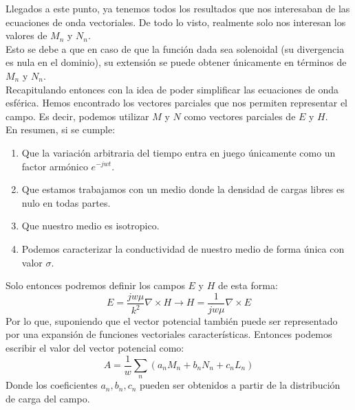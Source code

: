 \documentclass{article}
\begin{document}
Llegados a este punto, ya tenemos todos los resultados que nos interesaban de las ecuaciones de onda vectoriales. De todo lo visto, realmente solo nos interesan los valores de   $M_{n}$ y $N_{n}$.\\
Esto se debe a que en caso de que la función dada sea solenoidal (su divergencia es nula en el dominio), su extensión se puede obtener únicamente en términos de  $M_{n}$ y $N_{n}$. 
\\

Recapitulando entonces con la idea de poder simplificar las ecuaciones de onda esférica. Hemos encontrado los vectores parciales que nos permiten representar el campo. Es decir, podemos utilizar $M$ y $N$ como vectores parciales de $E$ y $H$.\\

En resumen, si se cumple:
\begin{enumerate}
    \item Que la variación arbitraria del tiempo entra en juego únicamente como un factor armónico $e^{-jwt}$.
    \item Que estamos trabajamos con un medio donde la densidad de cargas libres es nulo en todas partes.
    \item   Que nuestro medio es isotropico.
    \item Podemos caracterizar la conductividad de nuestro medio de forma única con valor $\sigma$.

\end{enumerate}
Solo entonces podremos definir los campos $E$ y $H$ de esta forma:
\begin{equation}
E = \frac{jw\mu}{k^2}\nabla \times H\xrightarrow{}   H= \frac{1}{jw\mu}\nabla \times E
\label{campo-EyH-cumpliendo-simplificacion-con-MnyNn}
\end{equation}
Por lo que, suponiendo que el vector potencial también puede ser representado por una expansión de funciones vectoriales características. Entonces podemos escribir el valor del vector potencial como:
\begin{equation}
A = \frac{1}{w}\sum_{n}(a_{n}M_{n}+b_{n}N_{n}+c_{n}L_{n})
\label{vector-potencial-cumpliendo-simplificacion-con-MnyNn}
\end{equation}
Donde los coeficientes $a_{n}, b_{n}, c_{n}$ pueden ser obtenidos a partir de la distribución de carga del campo.
\end{document}
